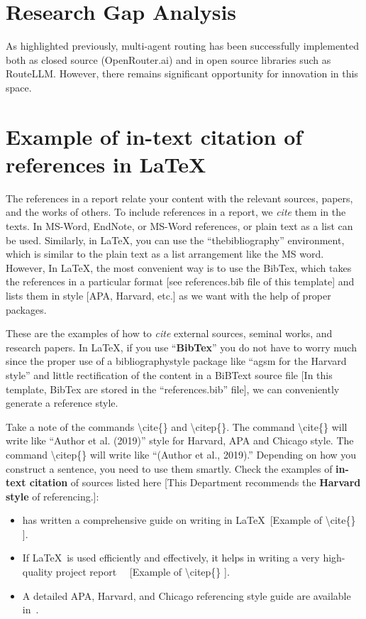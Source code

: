 \section{Research Gap Analysis}
As highlighted previously, multi-agent routing has been successfully implemented both as closed source (OpenRouter.ai) and in open source libraries such as RouteLLM. However, there remains significant opportunity for innovation in this space.

\section{Example of in-text citation of references in \LaTeX} 
The references in a report relate your content with the relevant sources, papers, and the works of others. To include references in a report, we \textit{cite} them in the texts. In MS-Word, EndNote, or MS-Word references, or plain text as a list can be used. Similarly, in \LaTeX, you can use the ``thebibliography'' environment, which is similar to the plain text as a list arrangement like the MS word. However, In \LaTeX, the most convenient way is to use the BibTex, which takes the references in a particular format [see references.bib file of this template] and lists them in style [APA, Harvard, etc.] as we want with the help of proper packages.    

These are the examples of how to \textit{cite} external sources, seminal works, and research papers. In \LaTeX, if you use ``\textbf{BibTex}'' you do not have to worry much since the proper use of a bibliographystyle package like ``agsm for the Harvard style'' and little rectification of the content in a BiBText source file [In this template, BibTex are stored in the ``references.bib'' file], we can conveniently generate  a reference style. 

Take a note of the commands \textbackslash cite\{\} and \textbackslash citep\{\}. The command \textbackslash cite\{\} will write like ``Author et al. (2019)'' style for Harvard, APA and Chicago style. The command \textbackslash citep\{\} will write like ``(Author et al., 2019).'' Depending on how you construct a sentence, you need to use them smartly. Check the examples of \textbf{in-text citation} of sources listed here [This Department recommends the \textbf{Harvard style} of referencing.]:
\begin{itemize}
    \item \cite{kottwitzlatex2021} has written a comprehensive guide on writing in \LaTeX ~[Example of \textbackslash cite\{\} ].
    \item If \LaTeX~is used efficiently and effectively, it helps in writing a very high-quality project report~\citep{lamport1994latex} ~[Example of \textbackslash citep\{\} ].   
    \item A detailed APA, Harvard, and Chicago referencing style guide are available in~\citep{uor_refernce_style}.
\end{itemize}


